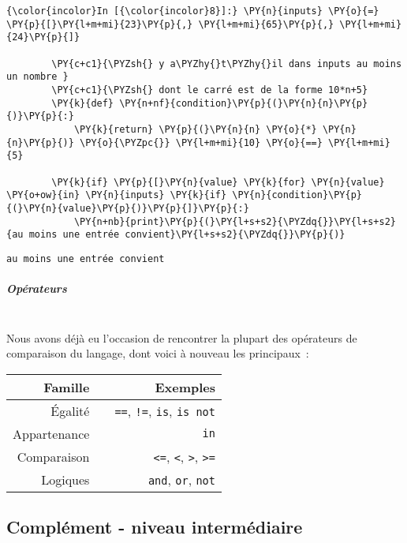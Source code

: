     \begin{Verbatim}[commandchars=\\\{\}]
{\color{incolor}In [{\color{incolor}8}]:} \PY{n}{inputs} \PY{o}{=} \PY{p}{[}\PY{l+m+mi}{23}\PY{p}{,} \PY{l+m+mi}{65}\PY{p}{,} \PY{l+m+mi}{24}\PY{p}{]}
        
        \PY{c+c1}{\PYZsh{} y a\PYZhy{}t\PYZhy{}il dans inputs au moins un nombre }
        \PY{c+c1}{\PYZsh{} dont le carré est de la forme 10*n+5}
        \PY{k}{def} \PY{n+nf}{condition}\PY{p}{(}\PY{n}{n}\PY{p}{)}\PY{p}{:}
            \PY{k}{return} \PY{p}{(}\PY{n}{n} \PY{o}{*} \PY{n}{n}\PY{p}{)} \PY{o}{\PYZpc{}} \PY{l+m+mi}{10} \PY{o}{==} \PY{l+m+mi}{5}
        
        \PY{k}{if} \PY{p}{[}\PY{n}{value} \PY{k}{for} \PY{n}{value} \PY{o+ow}{in} \PY{n}{inputs} \PY{k}{if} \PY{n}{condition}\PY{p}{(}\PY{n}{value}\PY{p}{)}\PY{p}{]}\PY{p}{:}
            \PY{n+nb}{print}\PY{p}{(}\PY{l+s+s2}{\PYZdq{}}\PY{l+s+s2}{au moins une entrée convient}\PY{l+s+s2}{\PYZdq{}}\PY{p}{)}
\end{Verbatim}


    \begin{Verbatim}[commandchars=\\\{\}]
au moins une entrée convient

    \end{Verbatim}

    \hypertarget{opuxe9rateurs}{%
\subparagraph{Opérateurs\\\\}\label{opuxe9rateurs}}

    Nous avons déjà eu l'occasion de rencontrer la plupart des opérateurs de
comparaison du langage, dont voici à nouveau les principaux~:

\begin{longtable}[]{@{}rlr@{}}
\toprule
Famille & & Exemples\tabularnewline
\midrule
\endhead
Égalité & & \texttt{==}, \texttt{!=}, \texttt{is},
\texttt{is\ not}\tabularnewline
Appartenance & & \texttt{in}\tabularnewline
Comparaison & & \texttt{\textless{}=}, \texttt{\textless{}},
\texttt{\textgreater{}}, \texttt{\textgreater{}=}\tabularnewline
Logiques & & \texttt{and}, \texttt{or}, \texttt{not}\tabularnewline
\bottomrule
\end{longtable}

    \hypertarget{compluxe9ment---niveau-intermuxe9diaire}{%
\subsection{Complément - niveau
intermédiaire}\label{compluxe9ment---niveau-intermuxe9diaire}}

